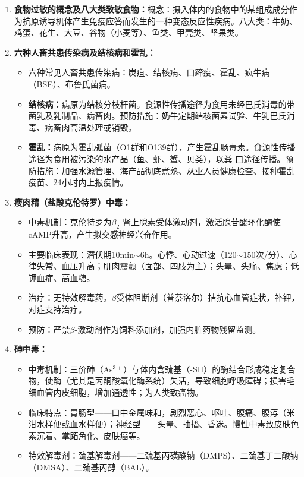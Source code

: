 {\begin{enumerate}[leftmargin=*, itemsep=4pt]
    \item \textbf{食物过敏的概念及八大类致敏食物：}概念：摄入体内的食物中的某组成成分作为抗原诱导机体产生免疫应答而发生的一种变态反应性疾病。八大类：牛奶、鸡蛋、花生、大豆、谷物（小麦等）、鱼类、甲壳类、坚果类。

    \item \textbf{六种人畜共患传染病及结核病和霍乱：}
    \begin{itemize}[leftmargin=*]
        \item 六种常见人畜共患传染病：炭疽、结核病、口蹄疫、霍乱、疯牛病（BSE）、布鲁氏菌病。
        \item \textbf{结核病：}病原为结核分枝杆菌。食源性传播途径为食用未经巴氏消毒的带菌乳及乳制品、病畜肉。预防措施：奶牛定期结核菌素试验、牛乳巴氏消毒、病畜肉高温处理或销毁。
        \item \textbf{霍乱：}病原为霍乱弧菌（O1群和O139群），产生霍乱肠毒素。食源性传播途径为食用被污染的水产品（鱼、虾、蟹、贝类），以粪-口途径传播。预防措施：加强水源管理、海产品彻底煮熟、从业人员健康检查、接种霍乱疫苗、24小时内上报疫情。
    \end{itemize}

    \item \textbf{瘦肉精（盐酸克伦特罗）中毒：}
    \begin{itemize}[leftmargin=*]
        \item 中毒机制：克伦特罗为$\beta_2$-肾上腺素受体激动剂，激活腺苷酸环化酶使cAMP升高，产生拟交感神经兴奋作用。
        \item 主要临床表现：潜伏期10min$\sim$6h。心悸、心动过速（120$\sim$150次/分）、心律失常、血压升高；肌肉震颤（面部、四肢为主）；头晕、头痛、焦虑；低钾血症、高血糖。
        \item 治疗：无特效解毒药。$\beta$受体阻断剂（普萘洛尔）拮抗心血管症状，补钾，对症支持治疗。
        \item 预防：严禁$\beta$-激动剂作为饲料添加剂，加强内脏药物残留监测。
    \end{itemize}

    \item \textbf{砷中毒：}
    \begin{itemize}[leftmargin=*]
        \item 中毒机制：三价砷（As$^{3+}$）与体内含巯基（-SH）的酶结合形成稳定复合物，使酶（尤其是丙酮酸氧化酶系统）失活，导致细胞呼吸障碍；损害毛细血管内皮细胞，增加通透性；为人类致癌物。
        \item 临床特点：胃肠型——口中金属味和，剧烈恶心、呕吐、腹痛、腹泻（米泔水样便或血水样便）；神经型——头晕、抽搐、昏迷。慢性中毒致皮肤色素沉着、掌跖角化、皮肤癌等。
        \item 特效解毒剂：巯基解毒剂——二巯基丙磺酸钠（DMPS）、二巯基丁二酸钠（DMSA）、二巯基丙醇（BAL）。
    \end{itemize}


\end{enumerate}}
